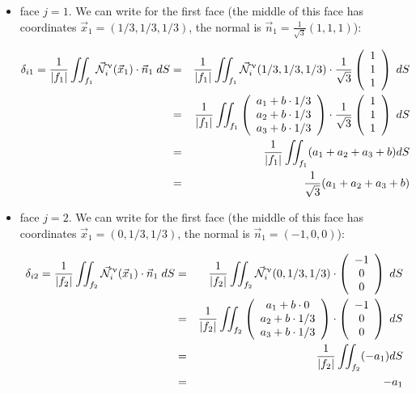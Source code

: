\begin{itemize}
\item face $j=1$. We can write for the first face (the middle of this face has coordinates 
$\vec{x}_1=(1/3,1/3,1/3)$, the normal is $\vec{n}_1=\frac{1}{\sqrt3}(1,1,1)$):

\begin{eqnarray}
\delta_{i1}=
\frac{1}{|f_1|} \iint_{f_1}
\vec{{\mathcal{N}}}^\upnu_i( \vec{x}_1) \cdot \vec{n}_1 \; dS
&=&\frac{1}{|f_1|} \iint_{f_1} \vec{{\mathcal{N}}}^\upnu_i( 1/3,1/3,1/3) \cdot 
\frac{1}{\sqrt3}\left(\begin{array}{c} 1 \\ 1 \\1 \end{array}\right) \; dS \nonumber\\
&=& \frac{1}{|f_1|} \iint_{f_1} 
\left(\begin{array}{c} a_1+b\cdot 1/3 \\ a_2 + b \cdot 1/3 \\ a_3 + b \cdot 1/3 \end{array}\right)
\cdot \frac{1}{\sqrt3} \left(\begin{array}{c} 1 \\ 1 \\ 1 \end{array}\right) \; dS \nonumber\\
&=& \frac{1}{|f_1|} \iint_{f_1} (a_1+a_2+a_3 + b) dS \nonumber\\
&=& \frac{1}{\sqrt 3} (a_1+a_2+a_3+b)
\end{eqnarray}

\item face $j=2$. We can write for the first face (the middle of this face has coordinates 
$\vec{x}_1=(0,1/3,1/3)$, the normal is $\vec{n}_1=(-1,0,0)$):

\begin{eqnarray}
\delta_{i2}=
\frac{1}{|f_2|} \iint_{f_2}
\vec{{\mathcal{N}}}^\upnu_i( \vec{x}_1) \cdot \vec{n}_1 \; dS
&=&\frac{1}{|f_2|} \iint_{f_2} \vec{{\mathcal{N}}}^\upnu_i( 0,1/3,1/3) \cdot 
\left(\begin{array}{c} -1\\0\\0 \end{array}\right) \; dS \nonumber\\
&=& \frac{1}{|f_2|} \iint_{f_2} 
\left(\begin{array}{c} a_1+b\cdot 0 \\ a_2 + b \cdot 1/3 \\ a_3 + b \cdot 1/3 \end{array}\right)
\cdot  \left(\begin{array}{c} -1\\0\\0 \end{array}\right) \; dS \nonumber\\
&=& \frac{1}{|f_2|} \iint_{f_2} (-a_1) dS \nonumber\\
&=& -a_1
\end{eqnarray}


\end{itemize}
